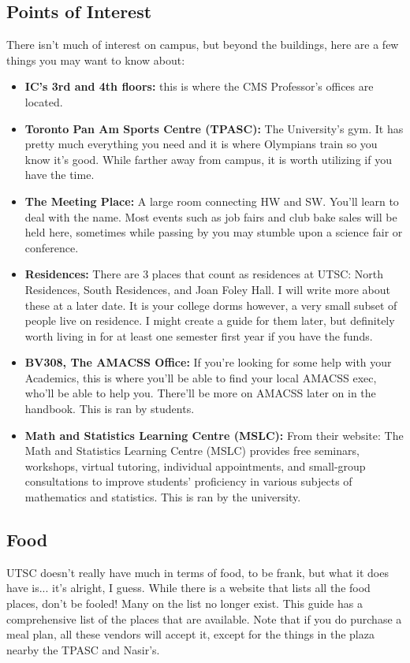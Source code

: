 \documentclass[11pt]{article}
\begin{document}
\subsection{Points of Interest}
There isn't much of interest on campus, but beyond the buildings, here
are a few things you may want to know about:
\begin{itemize}
    \item \textbf{IC's 3rd and 4th floors:} 
        this is where the CMS Professor's offices are located. 
    \item \textbf{Toronto Pan Am Sports Centre (TPASC):}
        The University's gym. It has pretty much everything you need and
        it is where Olympians train so you know it's good. While farther away
        from campus, it is worth utilizing if you have the time.
    \item \textbf{The Meeting Place:}
        A large room connecting HW and SW. You'll learn to deal with the
        name. Most events such as job fairs and club bake sales will be held
        here, sometimes while passing by you may stumble upon a science fair or
        conference.
    \item \textbf{Residences:}
        There are 3 places that count as residences at UTSC: North
        Residences, South Residences, and Joan Foley Hall. I will write more
        about these at a later date. It is your college dorms however, a very
        small subset of people live on residence. I might create a guide for
        them later, but definitely worth living in for at least one semester
        first year if you have the funds.
    \item \textbf{BV308, The AMACSS Office:}
        If you're looking for some help with your Academics, this is
        where you'll be able to find your local AMACSS exec, who'll be able to
        help you. There'll be more on AMACSS later on in the handbook. This is
        ran by students.
    \item \textbf{Math and Statistics Learning Centre (MSLC):}
        From their website: The Math and Statistics Learning Centre (MSLC)
        provides free seminars, workshops, virtual tutoring, individual
        appointments, and small-group consultations to improve students’
        proficiency in various subjects of mathematics and statistics. This is
        ran by the university.
\end{itemize}

\subsection{Food}
UTSC doesn't really have much in terms of food, to be frank, but what
it does have is... it's alright, I guess. While there is a website
that lists all the food places, don't be fooled! Many on the list no
longer exist. This guide has a comprehensive list of the places that are
available. Note that if you do purchase a meal plan, all these vendors
will accept it, except for the things in the plaza nearby the TPASC and
Nasir's.
\end{document}
